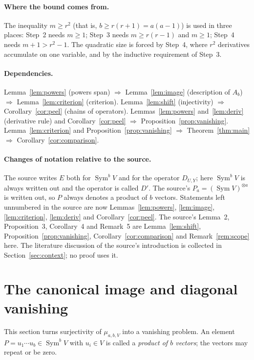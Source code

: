 \documentclass[11pt]{article}
\theoremstyle{remark}
\DeclareMathOperator{\Sym}{Sym}
\newcommand{\D}[2]{D_{#1,#2}}
\begin{document}
\paragraph{Where the bound comes from.}
The inequality $m\ge r^2$ (that is, $b\ge r(r+1)=a(a-1)$) is used in three
places: Step~2 needs $m\ge1$; Step~3 needs $m\ge r(r-1)$ and $m\ge1$;
Step~4 needs $m+1>r^2-1$. The quadratic size is forced by Step~4, where
$r^2$ derivatives accumulate on one variable, and by the inductive
requirement of Step~3.

\paragraph{Dependencies.}
Lemma~\ref{lem:powers} (powers span) $\Rightarrow$ Lemma~\ref{lem:image}
(description of $A_b$) $\Rightarrow$ Lemma~\ref{lem:criterion} (criterion).
Lemma~\ref{lem:shift} (injectivity) $\Rightarrow$ Corollary~\ref{cor:peel}
(chains of operators). Lemmas~\ref{lem:powers} and~\ref{lem:deriv}
(derivative rule) and Corollary~\ref{cor:peel} $\Rightarrow$
Proposition~\ref{prop:vanishing}. Lemma~\ref{lem:criterion} and
Proposition~\ref{prop:vanishing} $\Rightarrow$ Theorem~\ref{thm:main}
$\Rightarrow$ Corollary~\ref{cor:comparison}.

\paragraph{Changes of notation relative to the source.}
The source writes $E$ both for $\Sym^bV$ and for the operator $\D{U}{Y}$;
here $\Sym^bV$ is always written out and the operator is called $D'$. The
source's $P_a=(\Sym V)^{\otimes a}$ is written out, so $P$ always denotes a
product of $b$ vectors. Statements left unnumbered in the source are now
Lemmas~\ref{lem:powers}, \ref{lem:image}, \ref{lem:criterion},
\ref{lem:deriv} and Corollary~\ref{cor:peel}. The source's Lemma~2,
Proposition~3, Corollary~4 and Remark~5 are Lemma~\ref{lem:shift},
Proposition~\ref{prop:vanishing}, Corollary~\ref{cor:comparison} and
Remark~\ref{rem:scope} here. The literature discussion of the source's
introduction is collected in Section~\ref{sec:context}; no proof uses it.

\section{The canonical image and diagonal vanishing}\label{sec:map}

This section turns surjectivity of $\mu_{a,b,V}$ into a vanishing problem.
An element $P=u_1\cdots u_b\in\Sym^bV$ with $u_i\in V$ is called a
\emph{product of $b$ vectors}; the vectors may repeat or be zero.
\end{document}
